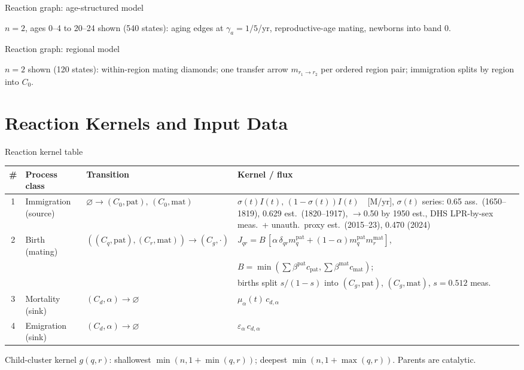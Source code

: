 \documentclass[10pt]{beamer}
\begin{document}
\begin{frame}{Reaction graph: age-structured model}
  \centering
  \resizebox{!}{0.74\textheight}{}

  {\small $n{=}2$, ages 0--4 to 20--24 shown (540 states): aging edges at $\gamma_a{=}1/5$/yr, reproductive-age mating, newborns into band 0.}
\end{frame}

\begin{frame}{Reaction graph: regional model}
  \centering
  \resizebox{!}{0.74\textheight}{}

  {\small $n{=}2$ shown (120 states): within-region mating diamonds; one transfer arrow $m_{r_1\to r_2}$ per ordered region pair; immigration splits by region into $C_0$.}
\end{frame}

\section{Reaction Kernels and Input Data}

\begin{frame}{Reaction kernel table}
  \small
  \begin{tabular}{@{}clll@{}}
    \toprule
    \# & Process class & Transition & Kernel / flux \\
    \midrule
    1 & Immigration (source) & $\varnothing \to (C_0,\mathrm{pat}),\,(C_0,\mathrm{mat})$
        & $\sigma(t)I(t),\,(1{-}\sigma(t))I(t)$~~[M/yr], $\sigma(t)$ series: 0.65 ass.\ (1650--1819), 0.629 est.\ (1820--1917), $\to$0.50 by 1950 est., DHS LPR-by-sex meas.\ + unauth.\ proxy est.\ (2015--23), 0.470 (2024) \\
    2 & Birth (mating) & $((C_q,\mathrm{pat}),(C_r,\mathrm{mat}))\to (C_{g},\cdot)$
        & $J_{qr}=B\,[\alpha\,\delta_{qr}m^{\mathrm{pat}}_q+(1-\alpha)m^{\mathrm{pat}}_qm^{\mathrm{mat}}_r]$,\\
      & & & $B=\min(\sum\beta^{\mathrm{pat}}c_{\mathrm{pat}},\sum\beta^{\mathrm{mat}}c_{\mathrm{mat}})$;\\
      & & & births split $s/(1{-}s)$ into $(C_g,\mathrm{pat})$, $(C_g,\mathrm{mat})$, $s=0.512$ meas. \\
    3 & Mortality (sink) & $(C_d,\alpha) \to \varnothing$ & $\mu_\alpha(t)\,c_{d,\alpha}$ \\
    4 & Emigration (sink) & $(C_d,\alpha) \to \varnothing$ & $\varepsilon_\alpha\,c_{d,\alpha}$ \\
    \bottomrule
  \end{tabular}
  \vspace{0.6em}

  Child-cluster kernel $g(q,r)$: shallowest $\min(n,1{+}\min(q,r))$; deepest $\min(n,1{+}\max(q,r))$. Parents are catalytic.
\end{frame}
\end{document}
